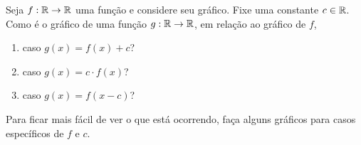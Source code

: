 Seja $f:\mathbb{R}\rightarrow\mathbb{R}$ uma função e considere seu gráfico.
Fixe uma constante $c\in\mathbb{R}$.
Como é o gráfico de uma função $g:\mathbb{R}\rightarrow\mathbb{R}$, em relação ao gráfico de $f$,
\begin{enumerate}
	\item caso $g(x)=f(x)+c$?
	\item caso $g(x)=c\cdot f(x)$?
	\item caso $g(x)=f(x-c)$?
\end{enumerate}
Para ficar mais fácil de ver o que está ocorrendo, faça alguns gráficos para casos específicos de $f$ e $c$.
